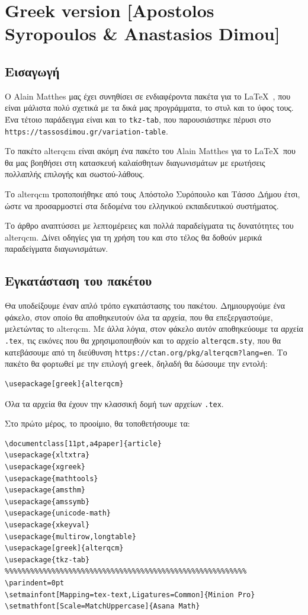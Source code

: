 \section{Greek version [Apostolos Syropoulos \& Anastasios Dimou]}

\subsection{Εισαγωγή} 
Ο Alain Matthes μας έχει συνηθίσει σε ενδιαφέροντα πακέτα για το \LaTeX\ , που είναι μάλιστα πολύ σχετικά με τα δικά μας προγράμματα, το στυλ και το ύφος τους. Ένα τέτοιο παράδειγμα είναι και το \texttt{tkz-tab}, που παρουσιάστηκε πέρυσι στο \texttt{https://tassosdimou.gr/variation-table}.

Το πακέτο \textsf{alterqcm} είναι ακόμη ένα πακέτο του Alain Matthes για το \LaTeX\, που θα μας βοηθήσει στη κατασκευή καλαίσθητων διαγωνισμάτων με ερωτήσεις πολλαπλής επιλογής και σωστού-λάθους.

Το \textsf{alterqcm}  τροποποιήθηκε από τους Απόστολο Συρόπουλο και Τάσσο Δήμου έτσι, ώστε να προσαρμοστεί στα δεδομένα του ελληνικού εκπαιδευτικού συστήματος. 

 Το άρθρο αναπτύσσει με λεπτομέρειες και πολλά παραδείγματα τις δυνατότητες του \textsf{alterqcm}. Δίνει οδηγίες για τη χρήση του και στο τέλος  θα δοθούν μερικά παραδείγματα διαγωνισμάτων.

\subsection{Εγκατάσταση του πακέτου}	
Θα υποδείξουμε έναν απλό τρόπο εγκατάστασης του πακέτου. Δημιουργούμε ένα φάκελο, στον οποίο θα αποθηκευτούν όλα τα αρχεία, που θα επεξεργαστούμε, μελετώντας το \textsf{alterqcm}. Με άλλα λόγια, στον φάκελο αυτόν αποθηκεύουμε τα αρχεία \texttt{.tex}, τις εικόνες που θα χρησιμοποιηθούν και το αρχείο \texttt{alterqcm.sty}, που θα κατεβάσουμε από τη διεύθυνση \texttt{https://ctan.org/pkg/alterqcm?lang=en}. Το πακέτο θα φορτωθεί με την επιλογή \texttt{greek}, δηλαδή θα δώσουμε την εντολή:
\begin{verbatim}
\usepackage[greek]{alterqcm}
\end{verbatim}
Όλα τα αρχεία θα έχουν την κλασσική δομή των αρχείων \texttt{.tex}.

Στο πρώτο μέρος, το προοίμιο, θα τοποθετήσουμε τα: 
\begin{verbatim}
\documentclass[11pt,a4paper]{article}
\usepackage{xltxtra}
\usepackage{xgreek}
\usepackage{mathtools}
\usepackage{amsthm}
\usepackage{amssymb}
\usepackage{unicode-math}
\usepackage{xkeyval}
\usepackage{multirow,longtable}
\usepackage[greek]{alterqcm}
\usepackage{tkz-tab}
%%%%%%%%%%%%%%%%%%%%%%%%%%%%%%%%%%%%%%%%%%%%%%%%%%%%%%%%%
\parindent=0pt
\setmainfont[Mapping=tex-text,Ligatures=Common]{Minion Pro}
\setmathfont[Scale=MatchUppercase]{Asana Math}
\end{verbatim}	

